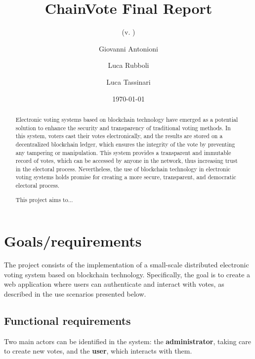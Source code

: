\documentclass{scrartcl}
\title{\LARGE
    ChainVote Final Report
}
\subtitle{(v. \version)}
\author{
    Giovanni Antonioni \\ \emailaddr{author1@email.it}
    \and 
    Luca Rubboli \\ \emailaddr{author2@gmail.com} 
    \and 
    Luca Tassinari \\ \emailaddr{luca.tassinari10@studio.unibo.it}
}
\date{\today}
\begin{document}
\maketitle

\begin{abstract}
    Electronic voting systems based on blockchain technology have emerged as a potential solution to enhance the security and transparency of traditional voting methods. In this system, voters cast their votes electronically, and the results are stored on a decentralized blockchain ledger, which ensures the integrity of the vote by preventing any tampering or manipulation. This system provides a transparent and immutable record of votes, which can be accessed by anyone in the network, thus increasing trust in the electoral process. Nevertheless, the use of blockchain technology in electronic voting systems holds promise for creating a more secure, transparent, and democratic electoral process.

    This project aims to... 
\end{abstract}

\section{Goals/requirements}


The project consists of the implementation of a small-scale distributed electronic voting system based on blockchain technology.
%
Specifically, the goal is to create a web application where users can authenticate and interact with votes, as described in the use scenarios presented below.
%

\subsection*{Functional requirements}

Two main actors can be identified in the system: the \textbf{administrator}, taking care to create new votes, and the \textbf{user}, which interacts with them.
\end{document}
